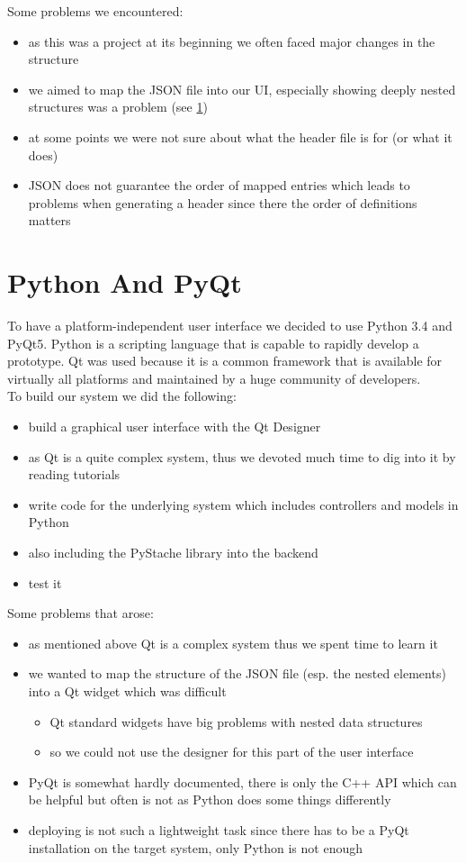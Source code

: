 \documentclass[10pt,a4paper]{report}
\begin{document}
	Some problems we encountered:
	\begin{itemize}
		\item as this was a project at its beginning we often faced major changes in the structure 
		\item we aimed to map the JSON file into our UI, especially showing deeply nested structures was a problem (see \ref{two})
		\item at some points we were not sure about what the header file is for (or what it does)
		\item JSON does not guarantee the order of mapped entries which leads to problems when generating a header since there the order of definitions matters 
	\end{itemize}
	
	\section{Python And PyQt}
	\label{two}
	
	To have a platform-independent user interface we decided to use Python 3.4 and PyQt5. Python is a scripting language that is capable to rapidly develop a prototype. Qt was used because it is a common framework that is available for virtually all platforms and maintained by a huge community of developers.\\
	To build our system we did the following:
	
	\begin{itemize}
		\item build a graphical user interface with the Qt Designer
		\item as Qt is a quite complex system, thus we devoted much time to dig into it by reading tutorials 
		\item write code for the underlying system which includes controllers and models in Python
		\item also including the PyStache library into the backend 
		\item test it
	\end{itemize}
	
	Some problems that arose:
	\begin{itemize}
		\item as mentioned above Qt is a complex system thus we spent time to learn it
		\item we wanted to map the structure of the JSON file (esp. the nested elements) into a Qt widget which was difficult 
		\begin{itemize}
			\item Qt standard widgets have big problems with nested data structures
			\item so we could not use the designer for this part of the user interface 
		\end{itemize}
		\item PyQt is somewhat hardly documented, there is only the C++ API which can be helpful but often is not as Python does some things differently
		\item deploying is not such a lightweight task since there has to be a PyQt installation on the target system, only Python is not enough
	\end{itemize}
	
\end{document}
